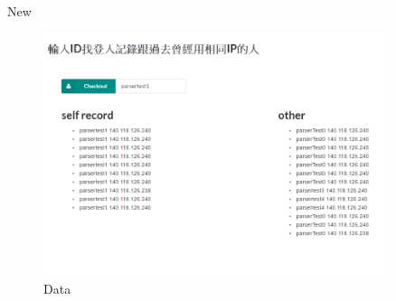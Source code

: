 \documentclass{beamer}
\begin{document}
\begin{frame} {New}
\begin{figure}[t]
    \centering
    \includegraphics[width=0.9\textwidth]{figures/w2.png}
    \caption{Data}
\end{figure}
\end{frame}



\section{}
\end{document}

